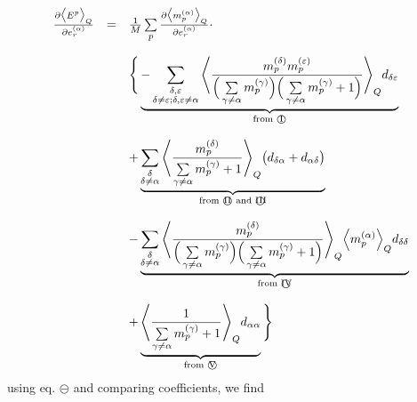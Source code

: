 \begin{equation}
	\begin{array}{lll}
	\frac{\partial \big<E^p\big>_Q}{\partial e_r^{(\alpha)}}
	& = & \frac{1}{M} \sum\limits_p \frac{\partial \big< m_p^{(\alpha)}
		\big>_Q}{\partial e_r^{(\alpha)}} \cdot \\\\
	&& \Bigg\{ \underbrace{-\sum\limits_{\substack{ \delta, \varepsilon \\
				\delta \neq \varepsilon; 
				\delta, \varepsilon \neq \alpha}}
		\Bigg< \frac{m_p^{(\delta)} m_p^{(\varepsilon)}}{
		\Big(\sum\limits_{\gamma \neq \alpha} m_p^{(\gamma)} \Big)
		\Big(\sum\limits_{\gamma \neq \alpha} m_p^{(\gamma)} + 1 \Big)}
		\Bigg>_Q d_{\delta\varepsilon}}_{
			\text{from \textcircled{I}}} \\\\
	&& + \underbrace{ \sum\limits_{\substack{\delta \\ \delta \neq \alpha}}
		\Bigg< \frac{m_p^{(\delta)}}{\sum\limits_{\gamma \neq \alpha}
			m_p^{(\gamma)} + 1}
		\Bigg>_Q \big( d_{\delta\alpha} + d_{\alpha\delta} \big)}_{
			\text{from \textcircled{II} and \textcircled{III}}} \\\\
	&& - \underbrace{ \sum\limits_{\substack{\delta \\ \delta \neq \alpha}}
		\Bigg< \frac{m_p^{(\delta)}}{
		\Big(\sum\limits_{\gamma \neq \alpha} m_p^{(\gamma)} \Big)
		\Big(\sum\limits_{\gamma \neq \alpha} m_p^{(\gamma)} + 1 \Big)}
		\Bigg>_Q \Big< m_p^{(\alpha)} \Big>_Q d_{\delta\delta} }_{
			\text{from \textcircled{IV}}} \\\\
	&& + \underbrace{ \Bigg< \frac{1}{\sum\limits_{\gamma \neq \alpha} 
				m_p^{(\gamma)} + 1} \Bigg>_Q d_{\alpha\alpha}}_{
					\text{from \textcircled{V}}}
	\Bigg\}
	\end{array}
\end{equation}
using eq. $\circleddash$ and comparing coefficients, we find

